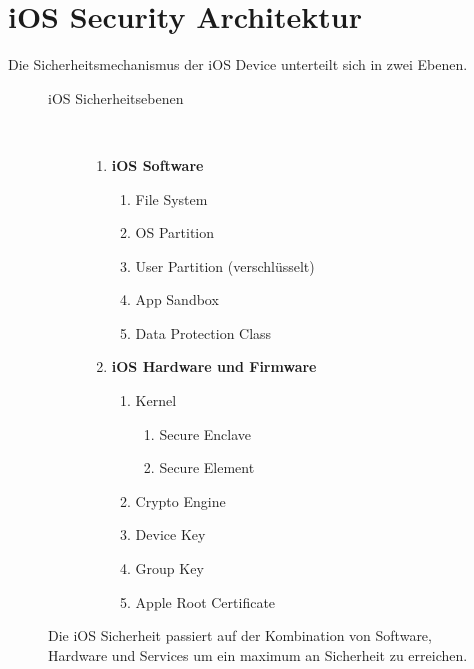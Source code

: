 
\section{iOS Security Architektur}
\label{sec:iOSSecArchitektur}

Die Sicherheitsmechanismus der iOS Device unterteilt sich in zwei Ebenen. 
\begin{figure}[htb]
  \begin{minipage}{0.6\textwidth} 
  		\begin{description}
   			\item[ iOS Sicherheitsebenen]~\par
         		\begin{enumerate}	
				\item  \textbf{iOS Software}
					\begin{enumerate}
       						\item File System
         					\item OS Partition
						\item User Partition (verschlüsselt)
						\item App Sandbox
						\item Data Protection Class
      					\end{enumerate}
      				\item  \textbf{iOS Hardware und Firmware}~\par
					\begin{enumerate}
       						\item Kernel
						\begin{enumerate}
						\item Secure Enclave
						\item Secure Element
         					\end{enumerate}	
						\item Crypto Engine
						\item Device Key
						\item Group Key
						\item Apple Root Certificate
      					\end{enumerate}
			\end{enumerate}
   		\end{description}
Die iOS Sicherheit passiert auf der Kombination von Software, Hardware und Services um ein maximum an Sicherheit zu erreichen.
	\end{minipage}

\end{figure}
